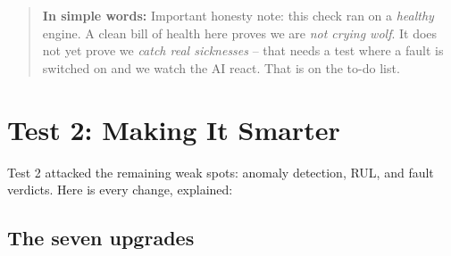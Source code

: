 \documentclass[11pt]{article}
\newenvironment{simplebox}
  {\par\medskip\noindent\begin{quote}\color{blue!55!black}\small
   \textbf{\textsf{In simple words:}}\space\space}
  {\end{quote}\medskip}
\begin{document}
\begin{simplebox}
Important honesty note: this check ran on a \emph{healthy} engine. A clean
bill of health here proves we are \emph{not crying wolf}. It does not yet
prove we \emph{catch real sicknesses} -- that needs a test where a fault is
switched on and we watch the AI react. That is on the to-do list.
\end{simplebox}

\section{Test 2: Making It Smarter}

Test 2 attacked the remaining weak spots: anomaly detection, RUL, and fault
verdicts. Here is every change, explained:

\subsection{The seven upgrades}
\end{document}
